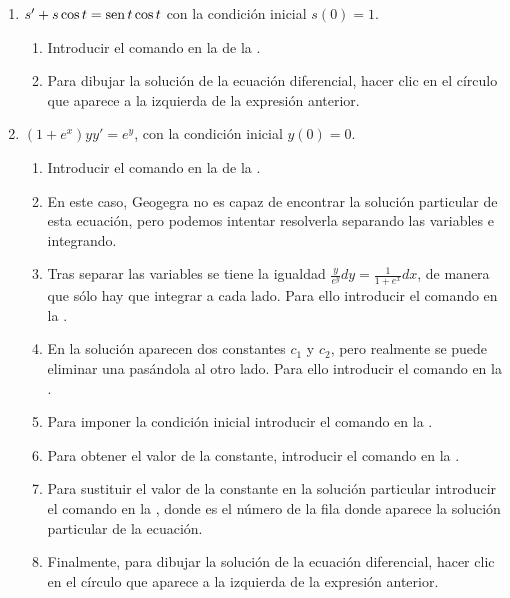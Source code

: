 \begin{enumerate}[leftmargin=*]
\begin{enumerate}
      \item $s'+s\cos t=\operatorname{sen} t\cos t$ con la condición inicial $s(0)=1$.
            \begin{indication}
            \begin{enumerate}
            \item Introducir el comando  en la  de la .
            \item Para dibujar la solución de la ecuación diferencial, hacer clic en el círculo que aparece a la izquierda de la expresión anterior.
            \end{enumerate}
            \end{indication}

      \item $(1+e^x)yy'=e^y$, con la condición inicial $y(0)=0$.
            \begin{indication}
            \begin{enumerate}
            \item Introducir el comando  en la  de la .
            \item En este caso, Geogegra no es capaz de encontrar la solución particular de esta ecuación, pero podemos intentar resolverla separando las variables e integrando.
            \item Tras separar las variables se tiene la igualdad $\frac{y}{e^y}dy = \frac{1}{1+e^x}dx$, de manera que sólo hay que integrar a cada lado.
                  Para ello introducir el comando  en la .
            \item En la solución aparecen dos constantes $c_1$ y $c_2$, pero realmente se puede eliminar una pasándola al otro lado.
                  Para ello introducir el comando  en la .
            \item Para imponer la condición inicial introducir el comando  en la .
            \item Para obtener el valor de la constante, introducir el comando  en la .
            \item Para sustituir el valor de la constante en la solución particular introducir el comando  en la , donde  es el número de la fila donde aparece la solución particular de la ecuación.
            \item Finalmente, para dibujar la solución de la ecuación diferencial, hacer clic en el círculo que aparece a la izquierda de la expresión anterior.
            \end{enumerate}
            \end{indication}
      \end{enumerate}



\end{enumerate}
